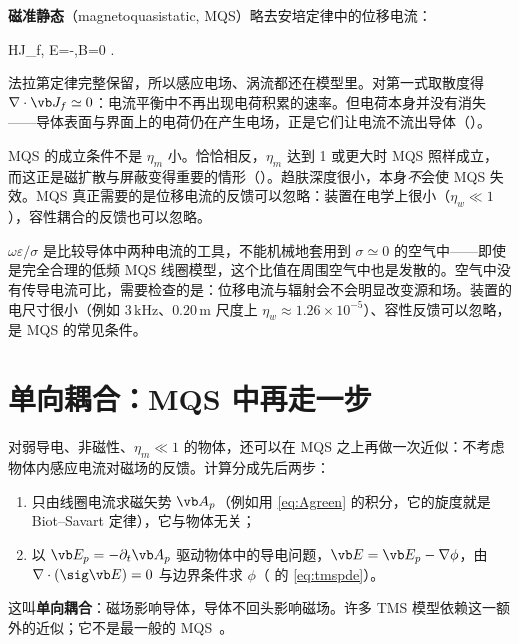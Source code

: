 \textbf{磁准静态}（magnetoquasistatic, MQS）略去安培定律中的位移电流：
\begin{keyeq}
\nabla\times\vb H\simeq\vb J_f,\qquad
\nabla\times\vb E=-,\qquad \nabla\cdot\vb B=0 .
\label{eq:mqs}
\end{keyeq}
法拉第定律完整保留，所以感应电场、涡流都还在模型里。对第一式取散度得 $\nabla\cdot\vb J_f\simeq0$：电流平衡中不再出现电荷积累的速率。但电荷本身并没有消失——导体表面与界面上的电荷仍在产生电场，正是它们让电流不流出导体（）。

MQS 的成立条件不是 $\eta_m$ 小。恰恰相反，$\eta_m$ 达到 1 或更大时 MQS 照样成立，而这正是磁扩散与屏蔽变得重要的情形（）。趋肤深度很小，本身\emph{不}会使 MQS 失效。MQS 真正需要的是位移电流的反馈可以忽略：装置在电学上很小（$\eta_w\ll1$），容性耦合的反馈也可以忽略。

\begin{pitfall}
$\omega\varepsilon/\sigma$ 是比较导体中两种电流的工具，不能机械地套用到 $\sigma\simeq0$ 的空气中——即使是完全合理的低频 MQS 线圈模型，这个比值在周围空气中也是发散的。空气中没有传导电流可比，需要检查的是：位移电流与辐射会不会明显改变源和场。装置的电尺寸很小（例如 $3\,\mathrm{kHz}$、$0.20\,\mathrm m$ 尺度上 $\eta_w\approx1.26\times10^{-5}$）、容性反馈可以忽略，是 MQS 的常见条件。
\end{pitfall}


\section{单向耦合：MQS 中再走一步}\label{sec:regimes-oneway}

对弱导电、非磁性、$\eta_m\ll1$ 的物体，还可以在 MQS 之上再做一次近似：不考虑物体内感应电流对磁场的反馈。计算分成先后两步：
\begin{enumerate}
\item 只由线圈电流求磁矢势 $\vb A_p$（例如用 \eqref{eq:Agreen} 的积分，它的旋度就是 Biot–Savart 定律），它与物体无关；
\item 以 $\vb E_p=-\partial_t\vb A_p$ 驱动物体中的导电问题，$\vb E=\vb E_p-\nabla\phi$，由 $\nabla\cdot(\sig\vb E)=0$ 与边界条件求 $\phi$（ 的 \eqref{eq:tmspde}）。
\end{enumerate}
这叫\textbf{单向耦合}：磁场影响导体，导体不回头影响磁场。许多 TMS 模型依赖这一额外的近似；它不是最一般的 MQS~\cite{simnibs}。

